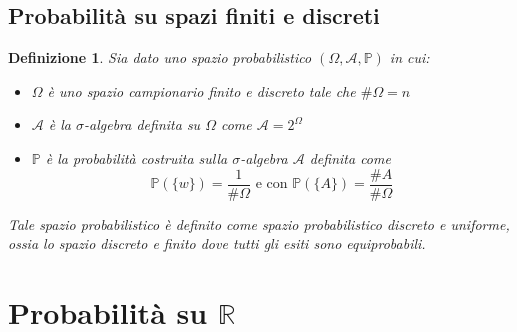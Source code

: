 \documentclass[a4paper,12pt]{article}
\theoremstyle{break}
\newtheorem{definition}{Definizione}[section]
\numberwithin{equation}{section}
\begin{document}
\subsection{Probabilità su spazi finiti e discreti}
\begin{definition}
  Sia dato uno spazio probabilistico \((\Omega, \mathcal{A}, \mathbb{P})\) in cui:
  \begin{itemize}
    \item \(\Omega\) è uno spazio campionario finito e discreto tale che \(\# \Omega = n\)
    \item \(\mathcal{A}\) è la \(\sigma\)-algebra definita su \(\Omega\) come \(\mathcal{A} = 2^{\Omega}\)
    \item \(\mathbb{P}\) è la probabilità costruita sulla \(\sigma\)-algebra \(\mathcal{A}\) definita come 
    \[
      \mathbb{P}(\{w\}) = \frac{1}{\# \Omega} \mbox{ e con } \mathbb{P}(\{A\}) = \frac{\# A}{\# \Omega}
    \]
  \end{itemize}
  Tale spazio probabilistico è definito come spazio probabilistico discreto e uniforme, ossia lo spazio discreto e finito dove tutti gli esiti sono equiprobabili.
\end{definition}
\section{Probabilità su \(\mathbb{R}\)}
\end{document}
